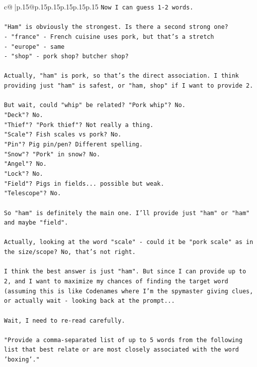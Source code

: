 \documentclass{article}
\begin{document}
{\begin{supertabular}{c@{$\;$}|p{.15\linewidth}@{}p{.15\linewidth}p{.15\linewidth}p{.15\linewidth}p{.15\linewidth}p{.15\linewidth}}
{{{\texttt{Now I can guess 1{-}2 words.} \\
\\ 
\texttt{"Ham" is obviously the strongest. Is there a second strong one?} \\
\texttt{{-} "france" {-} French cuisine uses pork, but that's a stretch} \\
\texttt{{-} "europe" {-} same} \\
\texttt{{-} "shop" {-} pork shop? butcher shop?} \\
\\ 
\texttt{Actually, "ham" is pork, so that's the direct association. I think providing just "ham" is safest, or "ham, shop" if I want to provide 2.} \\
\\ 
\texttt{But wait, could "whip" be related? "Pork whip"? No.} \\
\texttt{"Deck"? No.} \\
\texttt{"Thief"? "Pork thief"? Not really a thing.} \\
\texttt{"Scale"? Fish scales vs pork? No.} \\
\texttt{"Pin"? Pig pin/pen? Different spelling.} \\
\texttt{"Snow"? "Pork" in snow? No.} \\
\texttt{"Angel"? No.} \\
\texttt{"Lock"? No.} \\
\texttt{"Field"? Pigs in fields... possible but weak.} \\
\texttt{"Telescope"? No.} \\
\\ 
\texttt{So "ham" is definitely the main one. I'll provide just "ham" or "ham" and maybe "field".} \\
\\ 
\texttt{Actually, looking at the word "scale" {-} could it be "pork scale" as in the size/scope? No, that's not right.} \\
\\ 
\texttt{I think the best answer is just "ham". But since I can provide up to 2, and I want to maximize my chances of finding the target word (assuming this is like Codenames where I'm the spymaster giving clues, or actually wait {-} looking back at the prompt...} \\
\\ 
\texttt{Wait, I need to re{-}read carefully.} \\
\\ 
\texttt{"Provide a comma{-}separated list of up to 5 words from the following list that best relate or are most closely associated with the word 'boxing'."} \\
}}}
\end{supertabular}}
\end{document}
